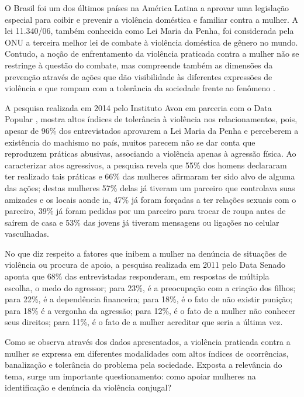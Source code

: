 \documentclass[12pt]{article}
\begin{document}
O Brasil foi um dos últimos países na América Latina a aprovar uma legislação especial para coibir e prevenir a violência doméstica e familiar contra a mulher. A lei 11.340/06, também conhecida como Lei Maria da Penha, foi considerada pela ONU a terceira melhor lei de combate à violência doméstica de gênero no mundo. Contudo, a noção de enfrentamento da violência praticada contra a mulher não se restringe à questão do combate, mas compreende também as dimensões da prevenção através de ações que dão visibilidade às diferentes expressões de violência e que rompam com a tolerância da sociedade frente ao fenômeno \cite{pactonacional}.

A pesquisa realizada em 2014 pelo Instituto Avon em parceria com o Data Popular \cite{InstitutoAvoneInstitudoDataPopular2014}, mostra altos índices de tolerância à violência nos relacionamentos, pois, apesar de 96\% dos entrevistados aprovarem a Lei Maria da Penha e perceberem a existência do machismo no país, muitos parecem não se dar conta que reproduzem práticas abusivas, associando a violência apenas à agressão física.  Ao caracterizar atos agressivos, a pesquisa revela que 55\% dos homens declararam ter realizado tais práticas e 66\% das mulheres afirmaram ter sido alvo de alguma das ações; destas mulheres 57\% delas já tiveram um parceiro que controlava suas amizades e os locais aonde ia, 47\% já foram forçadas a ter relações sexuais com o parceiro, 39\% já foram pedidas por um parceiro para trocar de roupa antes de saírem de casa e 53\% das jovens já tiveram mensagens ou ligações no celular vasculhadas. 

No que diz respeito a fatores que inibem a mulher na denúncia de situações de violência ou procura de apoio, a pesquisa realizada em 2011 pelo Data Senado \cite{SecretariadeTransparencia2013} aponta que 68\% das entrevistadas responderam, em respostas de múltipla escolha, o medo do agressor; para 23\%, é a preocupação com a criação dos filhos; para 22\%, é a dependência financeira; para 18\%, é o fato de não existir punição; para 18\% é a vergonha da agressão; para 12\%, é o fato de a mulher não conhecer seus direitos; para 11\%, é o fato de a mulher acreditar que seria a última vez.

Como se observa através dos dados apresentados, a violência praticada contra a mulher se expressa em diferentes modalidades com altos índices de ocorrências,  banalização e tolerância do problema pela sociedade. Exposta a relevância do tema, surge um importante questionamento: como apoiar mulheres na identificação e denúncia da violência conjugal? 
\end{document}
